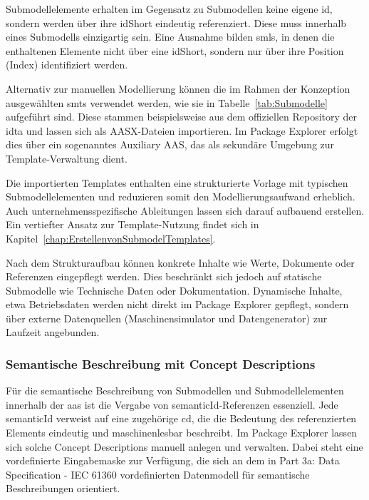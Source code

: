 Submodellelemente erhalten im Gegensatz zu Submodellen keine eigene \acs{id}, sondern werden über ihre idShort eindeutig referenziert.
Diese muss innerhalb eines Submodells einzigartig sein.
Eine Ausnahme bilden \acsp{sml}, in denen die enthaltenen Elemente nicht über eine idShort, sondern nur über ihre Position (Index) identifiziert werden.

Alternativ zur manuellen Modellierung können die im Rahmen der Konzeption ausgewählten \acsp{smt} verwendet werden, wie sie in Tabelle~\ref{tab:Submodelle} aufgeführt sind.
Diese stammen beispielsweise aus dem offiziellen Repository der \acs{idta} \cite{idtaTemplates} und lassen sich als AASX-Dateien importieren.
Im Package Explorer erfolgt dies über ein sogenanntes Auxiliary AAS, das als sekundäre Umgebung zur Template-Verwaltung dient.

Die importierten Templates enthalten eine strukturierte Vorlage mit typischen Submodellelementen und reduzieren somit den Modellierungsaufwand erheblich.
Auch unternehmensspezifische Ableitungen lassen sich darauf aufbauend erstellen.
Ein vertiefter Ansatz zur Template-Nutzung findet sich in Kapitel~\ref{chap:ErstellenvonSubmodelTemplates}.

Nach dem Strukturaufbau können konkrete Inhalte wie Werte, Dokumente oder Referenzen eingepflegt werden.
Dies beschränkt sich jedoch auf statische Submodelle wie Technische Daten oder Dokumentation.
Dynamische Inhalte, etwa Betriebsdaten werden nicht direkt im Package Explorer gepflegt, sondern über externe Datenquellen (Maschinensimulator und Datengenerator) zur Laufzeit angebunden.

\subsubsection*{Semantische Beschreibung mit Concept Descriptions}
\vspace{-0.5em}

Für die semantische Beschreibung von Submodellen und Submodellelementen innerhalb der \acs{aas} ist die Vergabe von semanticId-Referenzen essenziell.
Jede semanticId verweist auf eine zugehörige \acs{cd}, die die Bedeutung des referenzierten Elements eindeutig und maschinenlesbar beschreibt.
Im Package Explorer lassen sich solche Concept Descriptions manuell anlegen und verwalten.
Dabei steht eine vordefinierte Eingabemaske zur Verfügung, die sich an dem in Part 3a: Data Specification - IEC 61360 \cite{SpezifikationPart3a} vordefinierten Datenmodell für semantische Beschreibungen orientiert.

